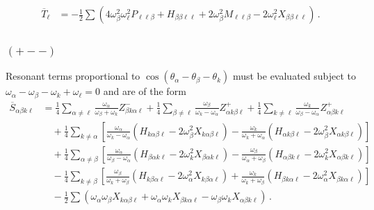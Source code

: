 \documentclass[letterpaper,11pt]{article}
\newcommand{\ok}{\omega_k}
\newcommand{\ol}{\omega_\ell}
\newcommand{\oal}{\omega_\alpha}
\newcommand{\obet}{\omega_{\beta}}
\begin{document}
\begin{align}
\overline{T}_\ell &= - \frac{1}{2} \sum \left( 4 \obet^2 \ol^2 P_{\ell \ell \beta} + H_{\beta \beta \ell \ell} + 2\obet^2 M_{\ell \ell \beta} - 2\ol^2 X_{\beta \beta \ell \ell} \right) \, .
\end{align}

\subsubsection{$(+--)$}
Resonant terms proportional to $\cos \left(\theta_\alpha - \theta_\beta - \theta_k \right)$ must be evaluated subject to $\omega_\alpha - \omega_\beta - \omega_k + \ol = 0$ and are of the form
\begin{align}
\overline{S}_{\alpha \beta k \ell} &= \frac{1}{4} \sum_{\alpha \neq \ell} \frac{\omega_\alpha}{\omega_\beta + \omega_k} Z^{-}_{\beta k \alpha \ell} + \frac{1}{4} \sum_{\beta \neq \ell} \frac{\omega_\beta}{\ok - \omega_{\alpha}} Z^{+}_{\alpha k \beta \ell} + \frac{1}{4} \sum_{k \neq \ell} \frac{\ok}{\obet - \omega_\alpha} Z^{+}_{\alpha \beta k \ell} \nonumber \\
%
& \quad + \frac{1}{4} \sum_{k \neq \alpha} \left[ \frac{\oal}{\ok - \oal} (H_{k \alpha \beta \ell} - 2 \obet^2 X_{k \alpha \beta \ell}) - \frac{\ok}{\ok + \oal} (H_{\alpha k \beta \ell} - 2\obet^2 X_{\alpha k \beta \ell}) \right] \nonumber \\
%
& \quad + \frac{1}{4} \sum_{\alpha \neq \beta} \left[ \frac{\oal}{\obet - \oal} (H_{\beta \alpha k \ell} - 2\ok^2 X_{\beta \alpha k \ell}) - \frac{\obet}{\oal + \obet}(H_{\alpha \beta k \ell} - 2 \ok^2 X_{\alpha \beta k \ell}) \right] \nonumber \\
%
& \quad - \frac{1}{4} \sum_{k \neq \beta} \left[ \frac{\obet}{\ok + \obet} (H_{k \beta \alpha \ell} - 2\oal^2 X_{k \beta \alpha \ell}) + \frac{\ok}{\ok + \obet}(H_{\beta k \alpha \ell} - 2\oal^2 X_{\beta k \alpha \ell}) \right] \nonumber \\
%
& \quad - \frac{1}{2} \sum \left( \oal \obet X_{k \alpha \beta \ell} + \oal \ok X_{\beta k \alpha \ell} - \obet \ok X_{\alpha \beta k \ell} \right) \, .
\end{align}
\end{document}
